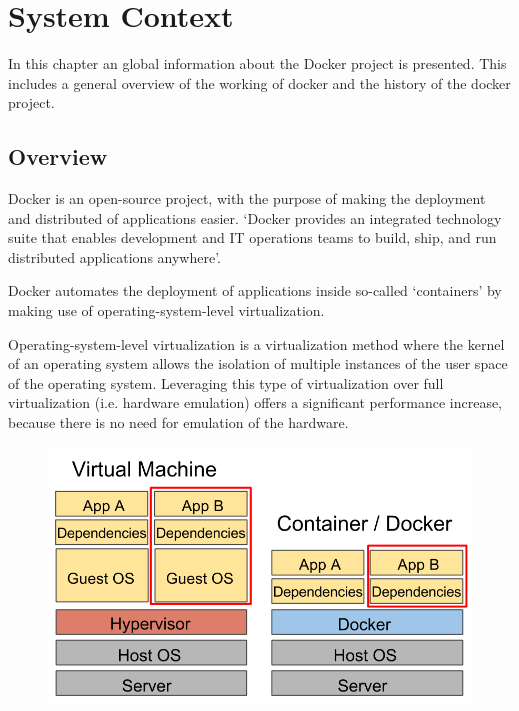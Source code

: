 \chapter{System Context}
\label{ch:context}

In this chapter an global information about the Docker project is presented. This includes a general overview of the working of docker and the history of the docker project.

\section{Overview}
Docker is an open-source project, with the purpose of making the deployment and distributed of applications easier.
`Docker provides an integrated technology suite that enables development and IT operations teams to build, ship, and run distributed applications anywhere'\cite{whatisdocker}.

Docker automates the deployment of applications inside so-called `containers' by making use of operating-system-level virtualization.

Operating-system-level virtualization is a virtualization method where the kernel of an operating system allows the isolation of multiple instances of the user space of the operating system. Leveraging this type of virtualization over full virtualization (i.e. hardware emulation) offers a significant performance increase, because there is no need for emulation of the hardware.\cite{VirtualizationTechnologies}

\begin{figure}[b!]
\centering
\includegraphics[scale=0.40,keepaspectratio=true]{./2-context/vmvsdocker}

\label{fig:vmvsdocker}
\end{figure}

